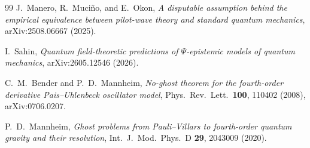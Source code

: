 \documentclass[11pt]{article}
\theoremstyle{remark}
\begin{document}
\begin{thebibliography}{99}
 J.~Manero, R.~Muci\~no, and E.~Okon,
\emph{A disputable assumption behind the empirical equivalence
between pilot-wave theory and standard quantum mechanics},
arXiv:2508.06667 (2025).

 I.~Sahin,
\emph{Quantum field-theoretic predictions of $\Psi$-epistemic models
of quantum mechanics}, arXiv:2605.12546 (2026).

 C.~M.~Bender and P.~D.~Mannheim,
\emph{No-ghost theorem for the fourth-order derivative
Pais--Uhlenbeck oscillator model},
Phys.\ Rev.\ Lett.\ \textbf{100}, 110402 (2008), arXiv:0706.0207.

 P.~D.~Mannheim,
\emph{Ghost problems from Pauli--Villars to fourth-order quantum
gravity and their resolution},
Int.\ J.\ Mod.\ Phys.\ D \textbf{29}, 2043009 (2020).

\end{thebibliography}
\end{document}
